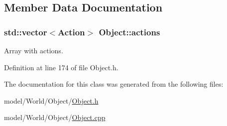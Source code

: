 \subsection{Member Data Documentation}
\hypertarget{classObject_a7fa5bd0db11056aac9440fa9f6eb2690}{
\subsubsection[{actions}]{\setlength{\rightskip}{0pt plus 5cm}std\-::vector$<${\bf Action}$>$ Object\-::actions\hspace{0.3cm}{\ttfamily [protected]}}}\label{classObject_a7fa5bd0db11056aac9440fa9f6eb2690}


Array with actions. 



Definition at line 174 of file Object.\-h.



The documentation for this class was generated from the following files\-:\begin{DoxyCompactItemize}
\item 
model/\-World/\-Object/\hyperlink{Object_8h}{Object.\-h}\item 
model/\-World/\-Object/\hyperlink{Object_8cpp}{Object.\-cpp}\end{DoxyCompactItemize}
